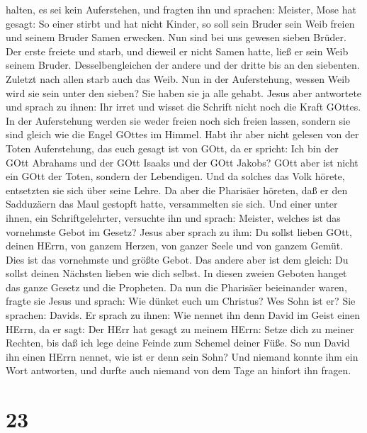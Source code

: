 halten, es sei kein Auferstehen, und fragten ihn  und
sprachen: Meister, Mose hat gesagt: So einer stirbt und hat nicht
Kinder, so soll sein Bruder sein Weib freien und seinem Bruder Samen
erwecken.  Nun sind bei uns gewesen sieben Brüder. Der
erste freiete und starb, und dieweil er nicht Samen hatte, ließ er sein
Weib seinem Bruder.  Desselbengleichen der andere und der
dritte bis an den siebenten.  Zuletzt nach allen starb auch
das Weib.  Nun in der Auferstehung, wessen Weib wird sie
sein unter den sieben? Sie haben sie ja alle gehabt.  Jesus
aber antwortete und sprach zu ihnen: Ihr irret und wisset die Schrift
nicht noch die Kraft GOttes.  In der Auferstehung werden
sie weder freien noch sich freien lassen, sondern sie sind gleich wie
die Engel GOttes im Himmel.  Habt ihr aber nicht gelesen
von der Toten Auferstehung, das euch gesagt ist von GOtt, da er spricht:
 Ich bin der GOtt Abrahams und der GOtt Isaaks und der GOtt
Jakobs? GOtt aber ist nicht ein GOtt der Toten, sondern der Lebendigen.
 Und da solches das Volk hörete, entsetzten sie sich über
seine Lehre.  Da aber die Pharisäer höreten, daß er den
Sadduzäern das Maul gestopft hatte, versammelten sie sich. 
Und einer unter ihnen, ein Schriftgelehrter, versuchte ihn und sprach:
 Meister, welches ist das vornehmste Gebot im Gesetz?
 Jesus aber sprach zu ihm: Du sollst lieben GOtt, deinen
HErrn, von ganzem Herzen, von ganzer Seele und von ganzem Gemüt.
 Dies ist das vornehmste und größte Gebot. 
Das andere aber ist dem gleich: Du sollst deinen Nächsten lieben wie
dich selbst.  In diesen zweien Geboten hanget das ganze
Gesetz und die Propheten.  Da nun die Pharisäer beieinander
waren, fragte sie Jesus  und sprach: Wie dünket euch um
Christus? Wes Sohn ist er? Sie sprachen: Davids.  Er sprach
zu ihnen: Wie nennet ihn denn David im Geist einen HErrn, da er sagt:
 Der HErr hat gesagt zu meinem HErrn: Setze dich zu meiner
Rechten, bis daß ich lege deine Feinde zum Schemel deiner Füße.
 So nun David ihn einen HErrn nennet, wie ist er denn sein
Sohn?  Und niemand konnte ihm ein Wort antworten, und
durfte auch niemand von dem Tage an hinfort ihn fragen.

\hypertarget{section-22}{%
\section{23}\label{section-22}}

